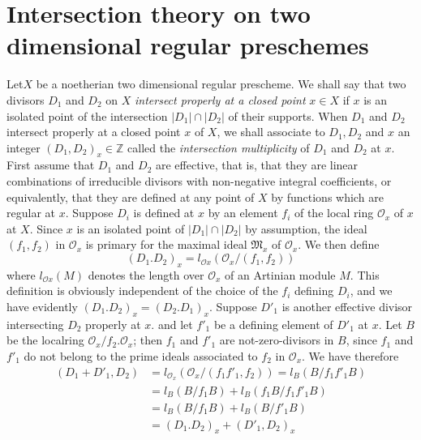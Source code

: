 \chapter{Intersection theory on two dimensional regular
  preschemes}\label{chap6}%

 
Let\pageoriginale $X$ be a noetherian two dimensional regular
prescheme. We shall 
say that two divisors $D_1$ and $D_2$ on $X$ \textit{intersect
  properly at a closed point } $x \in X$ if $x$ is an isolated point
of the intersection $|D_1| \cap | D_2|$ of their supports. When $D_1$
and $D_2$ intersect properly at a closed point $x$ of $X$, we shall
associate to $D_1, D_2$ and $x$ an integer $(D_1, D_2)_x \in
\mathbb{Z}$ called the \textit{intersection multiplicity} of $D_1$
and $D_2$ at $x$. First assume that $D_1$ and $D_2$ are effective,
that is, that they are linear combinations of irreducible divisors
with non-negative integral coefficients, or equivalently, that they
are defined at any point of $X$ by functions which are regular at
$x$. Suppose $D_i$ is defined at $x$ by an element $f_i$ of the local
ring $\mathscr{O}_x$ of $x$ at $X$. Since $x$ is an isolated point of
$|D_1 | \cap | D_2|$ by assumption, the ideal $(f_1, f_2)$ in
$\mathscr{O}_x$ is primary for the maximal ideal $\mathfrak{M}_x$ of
$\mathscr{O}_x$. We then define 
\begin{equation*}
  (D_1. D_2)_x = l_{\mathscr{O}x}(\mathscr{O}_x / (f_1, f_2))
  \tag{1}\label{chap6:eq1} 
\end{equation*}
where $l_{\mathscr{O}x}(M)$ denotes the length over $\mathscr{O}_x$ of
an Artinian module $M$. This definition is obviously independent of
the choice of the $f_i$ defining $D_i$, and we have evidently
$(D_1. D_2)_x = (D_2.D_1)_x$. Suppose $D'_1$ is another effective
divisor intersecting $D_2$ properly at $x$. and let $f'_1$ be a
defining element of $D'_1$ at $x$. Let $B$ be the local\pageoriginale  ring
$\mathscr{O}_x / f_2. \mathscr{O}_x$; then $f_1$ and $f'_1$ are
not-zero-divisors in $B$, since $f_1$ and $f'_1$ do not belong to the
prime ideals associated to $f_2$ in $\mathscr{O}_x$. We have therefore 
\begin{align*}
  (D_1 + D'_1, D_2) & = l_{\mathscr{O}_x} (\mathscr{O}_x / (f_1
  f'_1,f_2))= l_B (B/f_1 f'_1 B)\\ 
  &= l_B(B/f_1 B) + l_B(f_1 B/f_1 f'_1 B)\\
  &= l_B (B/f_1 B)+ l_B (B/f'_1 B)\\
  &=(D_1. D_2)_x + (D'_1, D_2)_x \tag{2}\label{chap6:eq2}
\end{align*}

